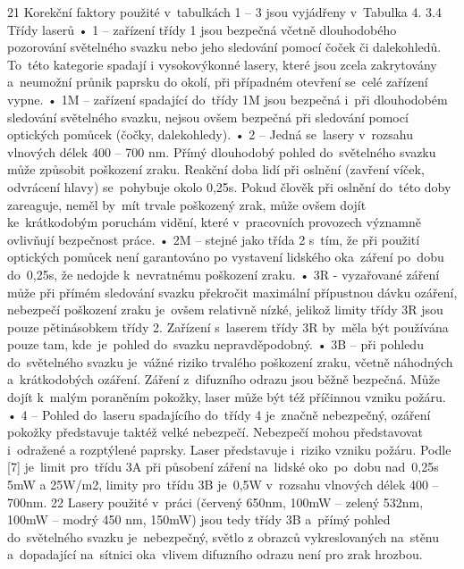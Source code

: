 21
Korekční faktory použité v~tabulkách 1 – 3 jsou vyjádřeny v~Tabulka 4.
3.4 Třídy laserů
• 1 – zařízení třídy 1 jsou bezpečná včetně dlouhodobého pozorování světelného
svazku nebo jeho sledování pomocí čoček či dalekohledů. To~této kategorie spadají
i vysokovýkonné lasery, které jsou zcela zakrytovány a~neumožní průnik paprsku
do okolí, při případném otevření se~celé zařízení vypne.
• 1M – zařízení spadající do~třídy 1M jsou bezpečná i~při dlouhodobém sledování
světelného svazku, nejsou ovšem bezpečná při sledování pomocí optických
pomůcek (čočky, dalekohledy).
• 2 – Jedná se~lasery v~rozsahu vlnových délek 400 – 700 nm. Přímý dlouhodobý
pohled do~světelného svazku může způsobit poškození zraku. Reakční doba lidí při
oslnění (zavření víček, odvrácení hlavy) se~pohybuje okolo 0,25s. Pokud člověk při
oslnění do~této doby zareaguje, neměl by~mít trvale poškozený zrak, může ovšem
dojít ke~krátkodobým poruchám vidění, které v~pracovních provozech významně
ovlivňují bezpečnost práce.
• 2M – stejné jako třída 2 s~tím, že při použití optických pomůcek není garantováno
po vystavení lidského oka~záření po~dobu do~0,25s, že nedojde k~nevratnému
poškození zraku.
• 3R - vyzařované záření může při přímém sledování svazku překročit maximální
přípustnou dávku ozáření, nebezpečí poškození zraku je~ovšem relativně nízké,
jelikož limity třídy 3R jsou pouze pětinásobkem třídy 2. Zařízení s~laserem třídy
3R by~měla být používána pouze tam, kde~je~pohled do~svazku nepravděpodobný.
• 3B – při pohledu do~světelného svazku je~vážné riziko trvalého poškození zraku,
včetně náhodných a~krátkodobých ozáření. Záření z~difuzního odrazu jsou běžně
bezpečná. Může dojít k~malým poraněním pokožky, laser může být též příčinnou
vzniku požáru.
• 4 – Pohled do~laseru spadajícího do~třídy 4 je~značně nebezpečný, ozáření pokožky
představuje taktéž velké nebezpečí. Nebezpečí mohou představovat i~odražené a
rozptýlené paprsky. Laser představuje i~riziko vzniku požáru.
Podle [7] je~limit pro~třídu 3A při působení záření na~lidské oko~po~dobu nad~0,25s 5mW a
25W/m2, limity pro~třídu 3B je~0,5W v~rozsahu vlnových délek 400 – 700nm.
22
Lasery použité v~práci (červený 650nm, 100mW – zelený 532nm, 100mW – modrý 450
nm, 150mW) jsou tedy třídy 3B a~přímý pohled do~světelného svazku je~nebezpečný, světlo z
obrazců vykreslovaných na~stěnu a~dopadající na~sítnici oka~vlivem difuzního odrazu není pro
zrak hrozbou.